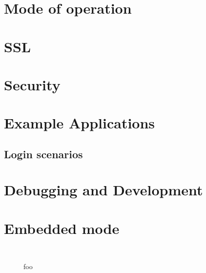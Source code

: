 \documentclass[11pt,oneside,english]{book}
\begin{document}
\chapter{Mode of operation}


\chapter{SSL}

\chapter{Security}

\chapter{Example Applications}

\section{Login scenarios}


\chapter{Debugging and Development}


\chapter {Embedded mode}




\begin{figure}[h]
\begin{verbatim}


\end{verbatim}
\caption{foo}
\end{figure}
\end{document}
